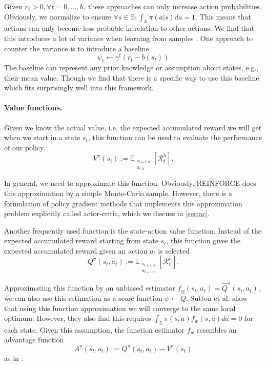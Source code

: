 Given $r_t > 0, \forall t=0,\dots,h$, these approaches can only increase action probabilities. Obviously, we normalize to ensure $\forall s \in \mathbb{S}: \int_\mathbb{A}{\pi(a|s)da} = 1$. This means that actions can only become less probable in relation to other actions. We find that this introduces a lot of variance when learning from samples \cite{Sutton:1999:PGM:3009657.3009806}. One approach to counter the variance is to introduce a baseline
\begin{equation}
  \psi_t \leftarrow \gamma^{t} (r_{t} - b(s_t))
\end{equation}
The baseline can represent any prior knowledge or assumption about states, e.g., their mean value. Though we find that there is a specific way to use this baseline which fits surprisingly well into this framework.

\paragraph{Value functions.} Given we know the actual value, i.e. the expected accumulated reward we will get when we start in a state $s_t$, this function can be used to evaluate the performance of our policy.
\begin{equation}
	V^{\pi}(s_t) := \mathbb{E}_{\substack{s_{t+1:h} \\ a_{t:h}}}\left[\mathcal{R}_t^h\right].
	\label{eqn:v}
\end{equation}

In general, we need to approximate this function. Obviously, REINFORCE does this approximation by a simple Monte-Carlo sample. However, there is a formulation of policy gradient methods that implements this approximation problem explicitly called actor-critic, which we discuss in \ref{sec:ac}. 

Another frequently used function is the state-action value function. Instead of the expected accumulated reward starting from state $s_t$, this function gives the expected accumulated reward given an action $a_t$ is selected
\begin{equation}
	Q^{\pi}(s_t, a_t) := \mathbb{E}_{\substack{s_{t+1:h} \\ a_{t+1:h}}}\left[\mathcal{R}_t^h\right].
	\label{eqn:q}
\end{equation}

Approximating this function by an unbiased estimator $f_w(s_t, a_t) = \hat{Q}^\pi(s_t, a_t)$, we can also use this estimation as a score function $\psi \leftarrow \hat{Q}$. Sutton et al. \cite{Sutton:1999:PGM:3009657.3009806} show that using this function approximation we will converge to the same local optimum. However, they also find this requires $\int_\mathbb{S}{\pi(s,a)f_w(s,a)da} = 0$ for each state. Given this assumption, the function estimator $f_w$ resembles an advantage function
\begin{equation}
	A^{\pi}(s_t, a_t) := Q^{\pi}(s_t, a_t) - V^{\pi}(s_t)
	\label{eqn:adv}
\end{equation}
as in \cite{1993b}.

